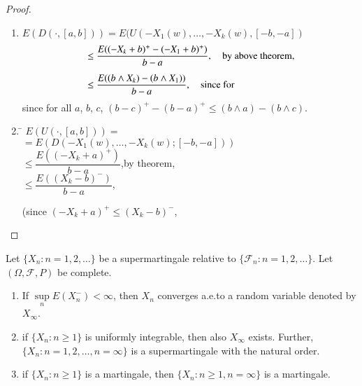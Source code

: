 \begin{proof}
\begin{enumerate}
\renewcommand{\theenumi}{\roman{enumi}}
\renewcommand{\labelenumi}{(\theenumi)}
\item $E(D(\cdot,[a, b]))=E(U(-X_{1}(w),\ldots,-X_{k}(w),[-b,-a])$
\begin{align*}
&\leq \frac{E((-X_{k}+b)^{+}-(-X_{1}+b)^{+})}{b-a},\quad\text{by above
    theorem,}\\[5pt] 
&\leq \frac{E((b\wedge X_{k})-(b\wedge X_{1}))}{b-a},\quad \text{since for}
\end{align*}
since for all $a$, $b$, $c$, $(b-c)^{+}-(b-a)^{+}\leq (b\wedge
a)-(b\wedge c)$.

\item \begin{tabbing}
\= $E(U(\cdot,[a,b]))=$\\[5pt]
\> $=E(D(-X_{1}(w),\ldots,-X_{k}(w);[-b,-a]))$\\[5pt]
\> $\leq \dfrac{E((-X_{k}+a)^{+})}{b-a}$,\q by theorem,\\[5pt]
\> $\leq \dfrac{E((X_{k}-b)^{-})}{b-a}$,
\end{tabbing}\pageoriginale

(since $(-X_{k}+a)^{+}\leq (X_{k}-b)^{-}$,
\end{enumerate}
\end{proof}

\begin{theorem*}
Let $\{X_{n}:n=1,2,\ldots\}$ be a supermartingale relative to
$\{\mathscr{F}_{n}:n=1,2,\ldots\}$. Let $(\Omega,\mathscr{F},P)$ be
complete.
\begin{enumerate}
\renewcommand{\theenumi}{\roman{enumi}}
\renewcommand{\labelenumi}{\rm(\theenumi)}
\item If $\sup\limits_{n}E(X^{-}_{n})<\infty$, then $X_{n}$ converges
  a.e.\@ to a random variable denoted by $X_{\infty}$.

\item if $\{X_{n}:n\geq 1\}$ is uniformly integrable, then also
  $X_{\infty}$ exists. Further, $\{X_{n}:n=1,2,\ldots,n=\infty\}$ is a
  supermartingale with the natural order.

\item if $\{X_{n}:n\geq 1\}$ is a martingale, then $\{X_{n}:n\geq
  1,n=\infty\}$ is a martingale.
\end{enumerate}
\end{theorem*}

